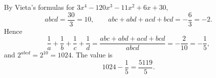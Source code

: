 By Vieta's formulas for $3x^4-120x^3-11x^2+6x+30$,
\[
abcd=\dfrac{30}{3}=10,\qquad abc+abd+acd+bcd=-\dfrac{6}{3}=-2 .
\]
Hence
\[
\dfrac{1}{a}+\dfrac{1}{b}+\dfrac{1}{c}+\dfrac{1}{d}=\dfrac{abc+abd+acd+bcd}{abcd}=-\dfrac{2}{10}=-\dfrac{1}{5} ,
\]
and $2^{abcd}=2^{10}=1024$. The value is
\[
1024-\dfrac{1}{5}=\boxed{\dfrac{5119}{5}}.
\]
